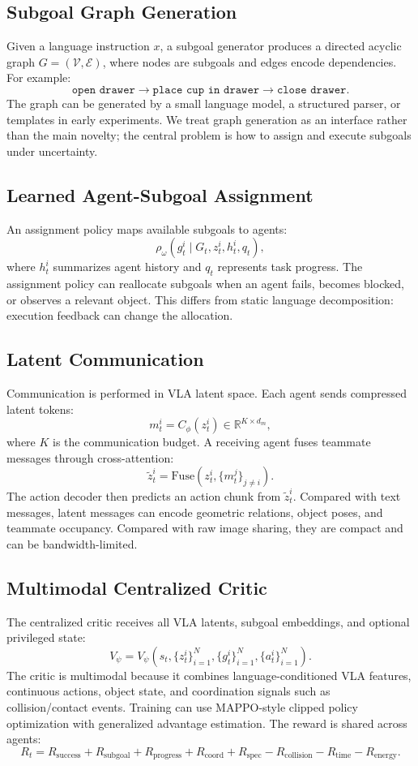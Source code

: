 \documentclass[11pt]{article}
\begin{document}
\subsection{Subgoal Graph Generation}
Given a language instruction $x$, a subgoal generator produces a directed acyclic graph $G=(\mathcal{V},\mathcal{E})$, where nodes are subgoals and edges encode dependencies. For example:
\[
\texttt{open drawer} \rightarrow \texttt{place cup in drawer} \rightarrow \texttt{close drawer}.
\]
The graph can be generated by a small language model, a structured parser, or templates in early experiments. We treat graph generation as an interface rather than the main novelty; the central problem is how to assign and execute subgoals under uncertainty.

\subsection{Learned Agent-Subgoal Assignment}
An assignment policy maps available subgoals to agents:
\[
\rho_{\omega}(g^i_t \mid G_t, z^i_t, h^i_t, q_t),
\]
where $h^i_t$ summarizes agent history and $q_t$ represents task progress. The assignment policy can reallocate subgoals when an agent fails, becomes blocked, or observes a relevant object. This differs from static language decomposition: execution feedback can change the allocation.

\subsection{Latent Communication}
Communication is performed in VLA latent space. Each agent sends compressed latent tokens:
\[
m^i_t = C_{\phi}(z^i_t) \in \mathbb{R}^{K \times d_m},
\]
where $K$ is the communication budget. A receiving agent fuses teammate messages through cross-attention:
\[
\tilde{z}^i_t = \mathrm{Fuse}(z^i_t, \{m^j_t\}_{j\neq i}).
\]
The action decoder then predicts an action chunk from $\tilde{z}^i_t$. Compared with text messages, latent messages can encode geometric relations, object poses, and teammate occupancy. Compared with raw image sharing, they are compact and can be bandwidth-limited.

\subsection{Multimodal Centralized Critic}
The centralized critic receives all VLA latents, subgoal embeddings, and optional privileged state:
\[
V_{\psi} = V_{\psi}(s_t, \{z^i_t\}_{i=1}^{N}, \{g^i_t\}_{i=1}^{N}, \{a^i_t\}_{i=1}^{N}).
\]
The critic is multimodal because it combines language-conditioned VLA features, continuous actions, object state, and coordination signals such as collision/contact events. Training can use MAPPO-style clipped policy optimization with generalized advantage estimation. The reward is shared across agents:
\[
R_t = R_{\mathrm{success}} + R_{\mathrm{subgoal}} + R_{\mathrm{progress}}
 + R_{\mathrm{coord}} + R_{\mathrm{spec}}
 - R_{\mathrm{collision}} - R_{\mathrm{time}} - R_{\mathrm{energy}}.
\]
\end{document}

